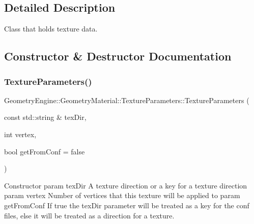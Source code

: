 \subsection{Detailed Description}
Class that holds texture data. 

\subsection{Constructor \& Destructor Documentation}
\mbox{\label{class_geometry_engine_1_1_geometry_material_1_1_texture_parameters_a1be8bba083e1de636196e4520312cc86}} 
\subsubsection{\texorpdfstring{TextureParameters()}{TextureParameters()}\hspace{0.1cm}{\footnotesize\ttfamily [1/2]}}
{\footnotesize\ttfamily Geometry\+Engine\+::\+Geometry\+Material\+::\+Texture\+Parameters\+::\+Texture\+Parameters (\begin{DoxyParamCaption}\item[{const std\+::string \&}]{tex\+Dir,  }\item[{int}]{vertex,  }\item[{bool}]{get\+From\+Conf = {\ttfamily false} }\end{DoxyParamCaption})\hspace{0.3cm}{\ttfamily [inline]}}

Constructor param tex\+Dir A texture direction or a key for a texture direction param vertex Number of vertices that this texture will be applied to param get\+From\+Conf If true the tex\+Dir parameter will be treated as a key for the conf files, else it will be treated as a direction for a texture. \mbox{\label{class_geometry_engine_1_1_geometry_material_1_1_texture_parameters_abbda2d6bc0bfc273cd8454acc8b326b7}} 
